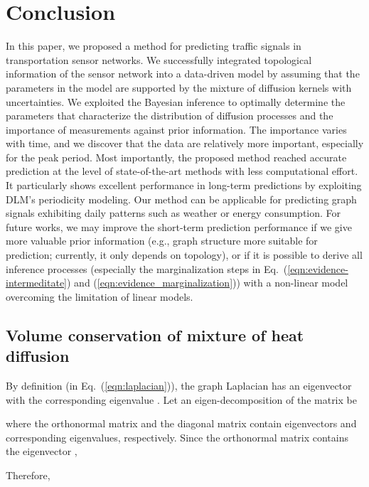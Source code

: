 \documentclass[journal]{IEEEtran}
\begin{document}
\section{Conclusion}
In this paper, we proposed a method for predicting traffic signals in transportation sensor networks. 
We successfully integrated topological information of the sensor network into a data-driven model by assuming that the parameters in the model are supported by the mixture of diffusion kernels with uncertainties.
We exploited the Bayesian inference to optimally determine the parameters that characterize the distribution of diffusion processes and the importance of measurements against prior information. 
The importance varies with time, and we discover that the data are relatively more important, especially for the peak period.
Most importantly, the proposed method reached accurate prediction at the level of state-of-the-art methods with less computational effort. 
It particularly shows excellent performance in long-term predictions by exploiting DLM's periodicity modeling.
Our method can be applicable for predicting graph signals exhibiting daily patterns such as weather or energy consumption.
For future works, we may improve the short-term prediction performance if we give more valuable prior information (e.g., graph structure more suitable for prediction; currently, it only depends on topology), or if it is possible to derive all inference processes (especially the marginalization steps in Eq.~(\ref{eqn:evidence-intermeditate}) and (\ref{eqn:evidence_marginalization})) with a non-linear model overcoming the limitation of linear models.

\printbibliography






\appendix


\subsection{Volume conservation of mixture of heat diffusion}\label{apdx:volume_conservation_heat_diffusion}
By definition (in Eq.~(\ref{eqn:laplacian})), the graph Laplacian  has an eigenvector  with the corresponding eigenvalue . Let an eigen-decomposition of the matrix be

where the orthonormal matrix  and the diagonal matrix  contain eigenvectors and corresponding eigenvalues, respectively.
Since the orthonormal matrix  contains the eigenvector ,

Therefore,
\end{document}
